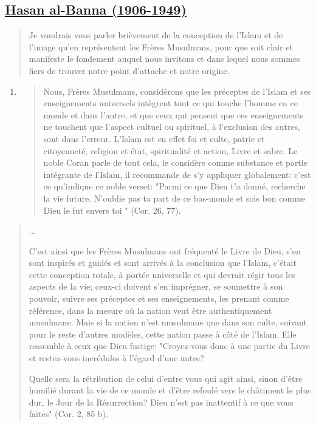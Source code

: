 \hypertarget{hasan-al-banna-1906-1949}{%
\subsection{\texorpdfstring{\underline{Hasan al-Banna
(1906-1949)}}{Hasan al-Banna (1906-1949)}}\label{hasan-al-banna-1906-1949}}

\begin{quote}
Je voudrais vous parler brièvement de la conception de l'Islam et de
l'image qu'en représentent les Frères Musulmans, pour que soit clair et
manifeste le fondement auquel nous invitons et dans lequel nous sommes
fiers de trouver notre point d'attache et notre origine.
\end{quote}

\begin{enumerate}
\def\labelenumi{\arabic{enumi}.}
\item
  \begin{quote}
  Nous, Frères Musulmans, considérons que les préceptes de l'Islam et
  ses enseignements universels intègrent tout ce qui touche l'homme en
  ce monde et dans l'autre, et que ceux qui pensent que ces
  enseignements ne touchent que l'aspect cultuel ou spirituel, à
  l'exclusion des autres, sont dans l'erreur. L'Islam est en effet foi
  et culte, patrie et citoyenneté, religion et état, spiritualité et
  action, Livre et sabre. Le noble Coran parle de tout cela, le
  considère comme substance et partie intégrante de l'Islam, il
  recommande de s'y appliquer globalement: c'est ce qu'indique ce noble
  verset: "Parmi ce que Dieu t'a donné, recherche la vie future.
  N'oublie pas ta part de ce bas-monde et sois bon comme Dieu le fut
  envers toi " (Cor. 26, 77).
  \end{quote}
\end{enumerate}

\begin{quote}
...

C'est ainsi que les Frères Musulmans ont fréquenté le Livre de Dieu,
s'en sont inspirés et guidés et sont arrivés à la conclusion que
l'Islam, c'était cette conception totale, à portée universelle et qui
devrait régir tous les aspects de la vie; ceux-ci doivent s'en
imprégner, se soumettre à son pouvoir, suivre ses préceptes et ses
enseignements, les prenant comme référence, dans la mesure où la nation
veut être authentiquement musulmane. Mais si la nation n'est musulmane
que dans son culte, suivant pour le reste d'autres modèles, cette nation
passe à côté de l'Islam. Elle ressemble à ceux que Dieu fustige:
"Croyez-vous donc à une partie du Livre et restez-vous incrédules à
l'égard d'une autre?

Quelle sera la rétribution de celui d'entre vous qui agit ainsi, sinon
d'être humilié durant la vie de ce monde et d'être refoulé vers le
châtiment le plus dur, le Jour de la Résurrection? Dieu n'est pas
inattentif à ce que vous faites" (Cor. 2, 85 b).
\end{quote}

